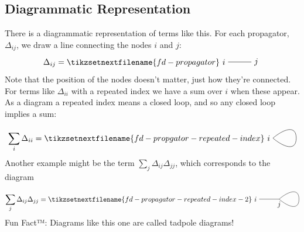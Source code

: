 \documentclass[fleqn]{NotesClass}
\begin{document}
    \subsection{Diagrammatic Representation}
    There is a diagrammatic representation of terms like this.
    For each propagator, \(\Delta_{ij}\), we draw a line connecting the nodes \(i\) and \(j\):
    \begin{equation}
        \Delta_{ij} = 
        \tikzsetnextfilename{fd-propagator}
        \begin{tikzpicture}[baseline=(i.base)]
            \draw (0, 0) node[left] (i) {\(i\)} -- (1, 0) node[right] {\(j\)};
        \end{tikzpicture}
    \end{equation}
    Note that the position of the nodes doesn't matter, just how they're connected.
    For terms like \(\Delta_{ii}\) with a repeated index we have a sum over \(i\) when these appear.
    As a diagram a repeated index means a closed loop, and so any closed loop implies a sum:
    \begin{equation}
        \sum_i \Delta_{ii} = 
        \tikzsetnextfilename{fd-propgator-repeated-index}
        \begin{tikzpicture}[baseline=(i.base)]
            \draw[looseness=1.5] (0, 0) to[out=40, in=90] (1, 0) to[out=270, in=-40] (0, 0) node [left] (i) {\(i\)};
        \end{tikzpicture}
    \end{equation}
    Another example might be the term \(\sum_{j}\Delta_{ij}\Delta_{jj}\), which corresponds to the diagram
    \begin{equation}
        \sum_j \Delta_{ij}\Delta_{jj} = 
        \tikzsetnextfilename{fd-propagator-repeated-index-2}
        \begin{tikzpicture}[baseline=(i.base)]
            \draw[looseness=1.5] (0, 0) node[left] (i) {\(i\)} -- (1, 0) to[out=40, in=90] (2, 0) to[out=270, in=-40] (1, 0) node [below] {\(j\)};
        \end{tikzpicture}
    \end{equation}
    Fun Fact™: Diagrams like this one are called tadpole diagrams!
    
\end{document}
